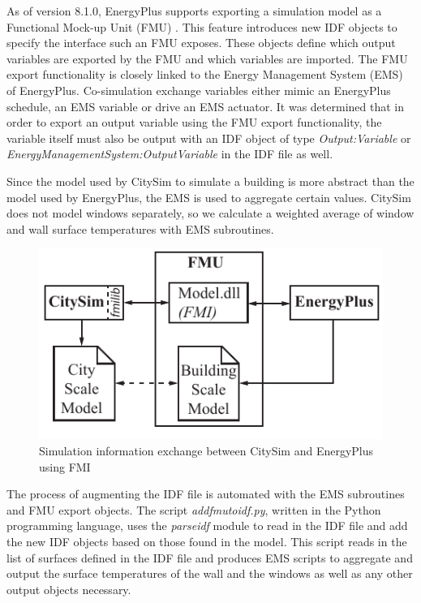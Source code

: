 \documentclass{tBPS2e}
\theoremstyle{plain}
\theoremstyle{definition}
\theoremstyle{remark}
\begin{document}
As of version 8.1.0, EnergyPlus supports exporting a simulation model as a Functional Mock-up Unit (FMU) \citep{Nouidui:2014hq}. This feature introduces new IDF objects to specify the interface such an FMU exposes. These objects define which output variables are exported by the FMU and which variables are imported. The FMU export functionality is closely linked to the Energy Management System (EMS) of EnergyPlus. Co-simulation exchange variables either mimic an EnergyPlus schedule, an EMS variable or drive an EMS actuator. It was determined that in order to export an output variable using the FMU export functionality, the variable itself must also be output with an IDF object of type \emph{Output:Variable} or \emph{EnergyManagementSystem:OutputVariable} in the IDF file as well.

Since the model used by CitySim to simulate a building is more abstract than the model used by EnergyPlus, the EMS is used to aggregate certain values. CitySim does not model windows separately, so we calculate a weighted average of window and wall surface temperatures with EMS subroutines.

\begin{figure}
\centering
\includegraphics[scale=1.0]{figures/UMEM_FMU_Overview}
\caption{Simulation information exchange between CitySim and EnergyPlus using FMI}
\label{fig:FMUOverview}
\end{figure}

The process of augmenting the IDF file is automated with the EMS subroutines and FMU export objects. The script \emph{addfmutoidf.py}, written in the Python programming language, uses the \emph{parseidf} module to read in the IDF file and add the new IDF objects based on those found in the model.  This script reads in the list of surfaces defined in the IDF file and produces EMS scripts to aggregate and output the surface temperatures of the wall and the windows as well as any other output objects necessary.
\end{document}
